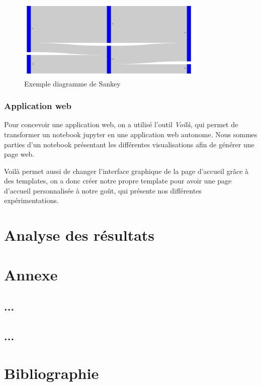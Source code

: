 \documentclass[oneside,13pt,a4paper]{report}
\begin{document}
\begin{figure}[!h]
\center
\includegraphics[width=0.8\textwidth]{img/sankey.png}
\caption{Exemple diagramme de Sankey}
\end{figure}

\subsection{Application web}
Pour concevoir une application web, on a utilisé l'outil \textit{Voilà}, qui permet de transformer un notebook jupyter en une application web autonome. Nous sommes parties d'un notebook présentant les différentes visualisations afin de générer une page web.




Voilà permet aussi de changer l'interface graphique de la page d'accueil grâce à des templates, on a donc créer notre propre template pour avoir une page d'accueil personnalisée à notre goût, qui présente nos différentes expérimentations.


\chapter{Analyse des résultats}


\appendix
\chapter{Annexe}

\section{...}

\section{...}

\chapter{Bibliographie}
\end{document}
